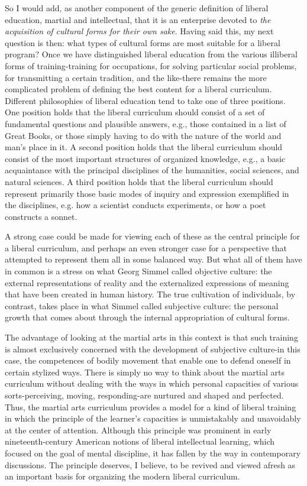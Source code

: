 So I would add, as another component of the generic definition of liberal education, martial and intellectual, that it is an enterprise devoted to \emph{the acquisition of cultural forms for their own sake}. Having said this, my next question is then: what types of cultural forms are most suitable for a liberal program? Once we have distinguished liberal education from the various illiberal forms of training-training for occupations, for solving particular social problems, for transmitting a certain tradition, and the like-there remains the more complicated problem of defining the best content for a liberal curriculum. Different philosophies of liberal education tend to take one of three positions. One position holds that the liberal curriculum should consist of a set of fundamental questions and plausible answers, e.g., those contained in a list of Great Books, or those simply having to do with the nature of the world and man's place in it. A second position holds that the liberal curriculum should consist of the most important structures of organized knowledge, e.g., a basic acquaintance with the principal disciplines of the humanities, social sciences, and natural sciences. A third position holds that the liberal curriculum should represent primarily those basic modes of inquiry and expression exemplified in the disciplines, e.g. how a scientist conducts experiments, or how a poet constructs a sonnet. 

A strong case could be made for viewing each of these as the central principle for a liberal curriculum, and perhaps an even stronger case for a perspective that attempted to represent them all in some balanced way. But what all of them have in common is a stress on what Georg Simmel called objective culture: the external representations of reality and the externalized expressions of meaning that have been created in human history. The true cultivation of individuals, by contrast, takes place in what Simmel called subjective culture: the personal growth that comes about through the internal appropriation of cultural forms. 

The advantage of looking at the martial arts in this context is that such training is almost exclusively concerned with the development of subjective culture-in this case, the competences of bodily movement that enable one to defend oneself in certain stylized ways. There is simply no way to think about the martial arts curriculum without dealing with the ways in which personal capacities of various sorts-perceiving, moving, responding-are nurtured and shaped and perfected. Thus, the martial arts curriculum provides a model for a kind of liberal training in which the principle of the learner's capacities is unmistakably and unavoidably at the center of attention. Although this principle was prominent in early nineteenth-century American notions of liberal intellectual learning, which focused on the goal of mental discipline, it has fallen by the way in contemporary discussions. The principle deserves, I believe, to be revived and viewed afresh as an important basis for organizing the modern liberal curriculum. 

